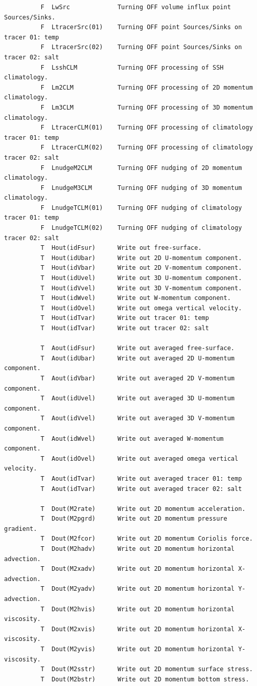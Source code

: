 \begin{verbatim}
          F  LwSrc             Turning OFF volume influx point Sources/Sinks.
          F  LtracerSrc(01)    Turning OFF point Sources/Sinks on tracer 01: temp
          F  LtracerSrc(02)    Turning OFF point Sources/Sinks on tracer 02: salt
          F  LsshCLM           Turning OFF processing of SSH climatology.
          F  Lm2CLM            Turning OFF processing of 2D momentum climatology.
          F  Lm3CLM            Turning OFF processing of 3D momentum climatology.
          F  LtracerCLM(01)    Turning OFF processing of climatology tracer 01: temp
          F  LtracerCLM(02)    Turning OFF processing of climatology tracer 02: salt
          F  LnudgeM2CLM       Turning OFF nudging of 2D momentum climatology.
          F  LnudgeM3CLM       Turning OFF nudging of 3D momentum climatology.
          F  LnudgeTCLM(01)    Turning OFF nudging of climatology tracer 01: temp
          F  LnudgeTCLM(02)    Turning OFF nudging of climatology tracer 02: salt
          T  Hout(idFsur)      Write out free-surface.
          T  Hout(idUbar)      Write out 2D U-momentum component.
          T  Hout(idVbar)      Write out 2D V-momentum component.
          T  Hout(idUvel)      Write out 3D U-momentum component.
          T  Hout(idVvel)      Write out 3D V-momentum component.
          T  Hout(idWvel)      Write out W-momentum component.
          T  Hout(idOvel)      Write out omega vertical velocity.
          T  Hout(idTvar)      Write out tracer 01: temp
          T  Hout(idTvar)      Write out tracer 02: salt

          T  Aout(idFsur)      Write out averaged free-surface.
          T  Aout(idUbar)      Write out averaged 2D U-momentum component.
          T  Aout(idVbar)      Write out averaged 2D V-momentum component.
          T  Aout(idUvel)      Write out averaged 3D U-momentum component.
          T  Aout(idVvel)      Write out averaged 3D V-momentum component.
          T  Aout(idWvel)      Write out averaged W-momentum component.
          T  Aout(idOvel)      Write out averaged omega vertical velocity.
          T  Aout(idTvar)      Write out averaged tracer 01: temp
          T  Aout(idTvar)      Write out averaged tracer 02: salt

          T  Dout(M2rate)      Write out 2D momentum acceleration.
          T  Dout(M2pgrd)      Write out 2D momentum pressure gradient.
          T  Dout(M2fcor)      Write out 2D momentum Coriolis force.
          T  Dout(M2hadv)      Write out 2D momentum horizontal advection.
          T  Dout(M2xadv)      Write out 2D momentum horizontal X-advection.
          T  Dout(M2yadv)      Write out 2D momentum horizontal Y-advection.
          T  Dout(M2hvis)      Write out 2D momentum horizontal viscosity.
          T  Dout(M2xvis)      Write out 2D momentum horizontal X-viscosity.
          T  Dout(M2yvis)      Write out 2D momentum horizontal Y-viscosity.
          T  Dout(M2sstr)      Write out 2D momentum surface stress.
          T  Dout(M2bstr)      Write out 2D momentum bottom stress.


\end{verbatim}
